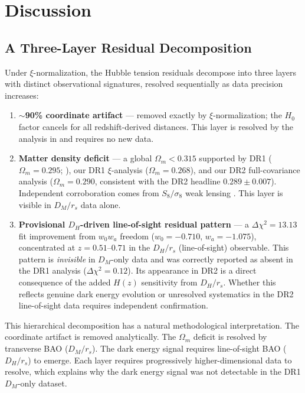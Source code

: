 \documentclass[12pt,a4paper]{article}
\begin{document}
\section{Discussion}

\subsection{A Three-Layer Residual Decomposition}

Under $\xi$-normalization, the Hubble tension residuals decompose into three
layers with distinct observational signatures, resolved sequentially as data
precision increases:
\begin{enumerate}
    \item \textbf{$\sim$90\% coordinate artifact} --- removed exactly by
    $\xi$-normalization; the $H_0$ factor cancels for all redshift-derived
    distances. This layer is resolved by the analysis in
    \citet{Martin2025_Paper1} and requires no new data.
    \item \textbf{Matter density deficit} --- a global $\Omega_m < 0.315$
    supported by DR1 ($\Omega_m = 0.295$; \citealt{DESI_2024_DR1}), our
    DR1 $\xi$-analysis ($\Omega_m = 0.268$), and our DR2 full-covariance
    analysis ($\Omega_m = 0.290$, consistent with the DR2 headline $0.289 \pm
    0.007$). Independent corroboration comes from $S_8/\sigma_8$ weak lensing
    \citep{Heymans2021, Amon2022}. This layer is visible in $D_M/r_s$ data
    alone.
    \item \textbf{Provisional $D_H$-driven line-of-sight residual pattern} ---
    a $\Delta\chi^2 = 13.13$ fit improvement from $w_0w_a$ freedom ($w_0 =
    -0.710$, $w_a = -1.075$), concentrated at $z = 0.51$--$0.71$ in the
    $D_H/r_s$ (line-of-sight) observable. This pattern is \emph{invisible} in
    $D_M$-only data and was correctly reported as absent in the DR1 analysis
    ($\Delta\chi^2 = 0.12$). Its appearance in DR2 is a direct consequence of
    the added $H(z)$ sensitivity from $D_H/r_s$. Whether this reflects genuine
    dark energy evolution or unresolved systematics in the DR2 line-of-sight
    data requires independent confirmation.
\end{enumerate}

This hierarchical decomposition has a natural methodological interpretation. The
coordinate artifact is removed analytically. The $\Omega_m$ deficit is resolved
by transverse BAO ($D_M/r_s$). The dark energy signal requires line-of-sight BAO
($D_H/r_s$) to emerge. Each layer requires progressively higher-dimensional data
to resolve, which explains why the dark energy signal was not detectable in the
DR1 $D_M$-only dataset.
\end{document}

